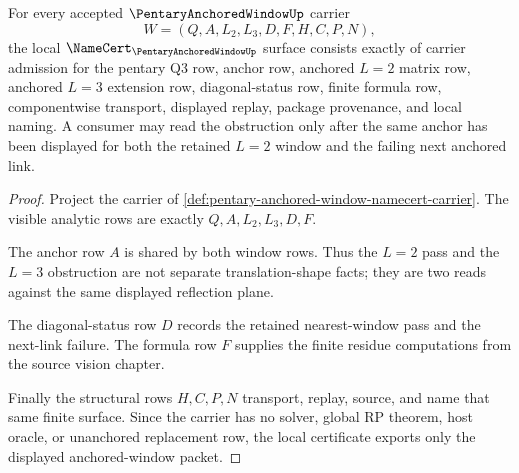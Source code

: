 \begin{theorem}
\label{thm:pentary-anchored-window-namecert-obligations}
For every accepted $\PentaryAnchoredWindowUp$ carrier
$$
W=(Q,A,L_2,L_3,D,F,H,C,P,N),
$$
the local $\NameCert_{\PentaryAnchoredWindowUp}$ surface consists exactly of carrier admission for the pentary Q3 row, anchor row, anchored $L=2$ matrix row, anchored $L=3$ extension row, diagonal-status row, finite formula row, componentwise transport, displayed replay, package provenance, and local naming. A consumer may read the obstruction only after the same anchor has been displayed for both the retained $L=2$ window and the failing next anchored link.
\end{theorem}
\begin{proof}
Project the carrier of \autoref{def:pentary-anchored-window-namecert-carrier}. The visible analytic rows are exactly $Q,A,L_2,L_3,D,F$.

The anchor row $A$ is shared by both window rows. Thus the $L=2$ pass and the $L=3$ obstruction are not separate translation-shape facts; they are two reads against the same displayed reflection plane.

The diagonal-status row $D$ records the retained nearest-window pass and the next-link failure. The formula row $F$ supplies the finite residue computations from the source vision chapter.

Finally the structural rows $H,C,P,N$ transport, replay, source, and name that same finite surface. Since the carrier has no solver, global RP theorem, host oracle, or unanchored replacement row, the local certificate exports only the displayed anchored-window packet.
\end{proof}




